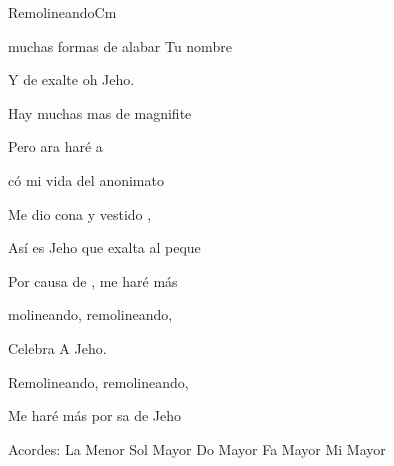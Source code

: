 \documentclass[12pt, spanish]{book}
\begin{document}
\begin{song}{Remolineando}{Cm}
        \begin{SBExtraKeys}{
            \clearpage


            \begin{SBOpGroup}
                 muchas formas de alabar Tu nombre

                Y de exalte oh Jeho.

                Hay muchas mas de magnifite

                Pero ara  haré a
            \end{SBOpGroup}

            \begin{SBOpGroup}
                có mi vida del anonimato

                Me dio cona y vestido ,

                Así es Jeho que exalta al peque

                Por causa de ,  me haré más 
            \end{SBOpGroup}

            \begin{SBChorus}
                molineando, remolineando,

                Celebra A Jeho.

                Remolineando, remolineando,

                Me haré más  por sa de Jeho
            \end{SBChorus}

            \ifChordBk
            \begin{SBOpGroup}
                Acordes:\break
                \upchord{\Am}\qquad La Menor \hfill
                \upchord{\G}\qquad Sol Mayor \hfill\null\break
                \upchord{\C}\qquad Do Mayor \hfill
                \upchord{\F}\qquad Fa Mayor \hfill
                \upchord{\E}\qquad Mi Mayor \hfill\null\break
            \end{SBOpGroup}
            \fi
        }\end{SBExtraKeys}
    \end{song}
\end{document}
